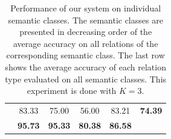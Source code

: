 {\begin{table}[h]
\begin{center}
\begin{tabular}{|l||c|c|c|c||c|}
{    empire            &  83.33  &  75.00  &  56.00  &  83.21  &  \textbf{74.39} \\ }
    \hline
    \hline
    \textbf{Average}  & \textbf{95.73}  & \textbf{95.33} & \textbf{80.38} & \textbf{86.58} & \\ %
    \hline
\end{tabular}
\end{center}
\caption{Performance of our system on individual semantic classes.
  The semantic classes are presented in decreasing order of the 
  average accuracy on all relations of the corresponding semantic class. 
  The last row shows the average accuracy of each relation type evaluated on all semantic classes.
  This experiment is done with $K=3$.}
\label{tab:exp-ind-class}
\end{table}


\vspace*{2 mm}

}
